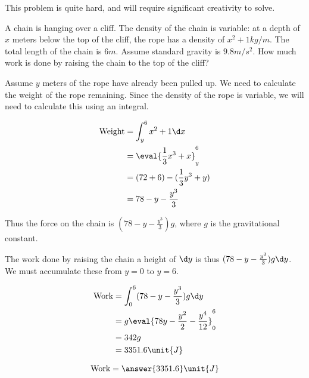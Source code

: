 \documentclass{ximera}
\author{Steven Gubkin}
\begin{document}
\begin{exercise}


\begin{warning}
This problem is quite hard, and will require significant creativity to solve.
\end{warning}

A chain is hanging over a cliff.  The density of the chain is variable:  at a depth of $x$ meters below the top of the cliff, the rope has a density of $x^2+1 \unit{kg}/\unit{m}$.  The total length of the chain is $6 \unit{m}$. Assume standard gravity is $9.8 \unit{m}/\unit{s}^2 $. How much work is done by raising the chain to the top of the cliff?

\begin{hint}
	Assume $y$ meters of the rope have already been pulled up.  We need to calculate the weight of the rope remaining.  Since the density of the rope is variable, we will need to calculate this using an integral.
	
	\begin{align*}
		\textrm{Weight} &= \int_y^6 x^2+1 \d x\\
			&= \eval{\frac{1}{3}x^3+x}_y^6\\
			&= (72+6)-(\frac{1}{3}y^3+y)\\
			&=78-y-\frac{y^3}{3}
	\end{align*} 
\end{hint}

\begin{hint}
	Thus the force on the chain is $(78-y-\frac{y^3}{3})g$, where $g$ is the gravitational constant.
\end{hint}

\begin{hint}
	The work done by raising the chain a height of $\d y$ is thus $(78-y-\frac{y^3}{3})g \d y$.  We must accumulate these from $y=0$ to $y=6$.
	
	\begin{align*}
	\textrm{Work} &= \int_0^6 (78-y-\frac{y^3}{3})g \d y\\	
			&=g\eval{78y - \frac{y^2}{2} - \frac{y^4}{12}}_0^6\\
			&= 342g\\
			&=3351.6 \unit{J}
	\end{align*}
\end{hint}

\begin{prompt}
	\[
	\textrm{Work} = \answer{3351.6} \unit{J}
	\]
\end{prompt}

\end{exercise}
\end{document}
